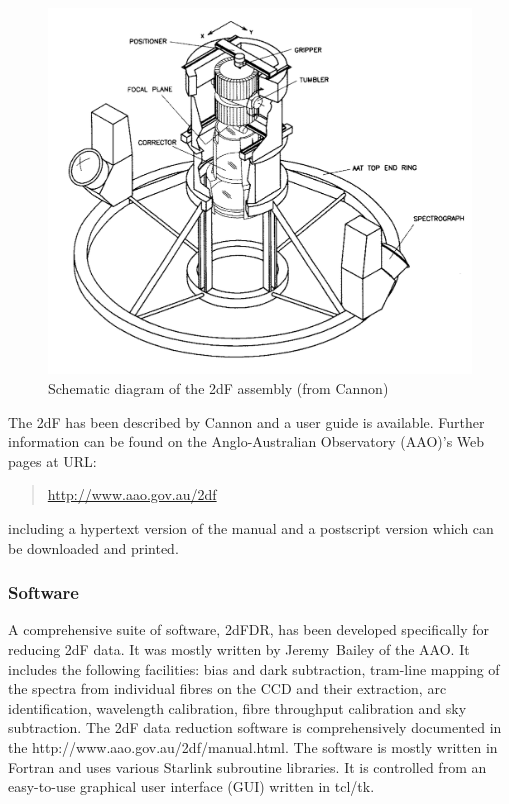 \documentclass[twoside,11pt]{starlink}
\begin{document}
\begin{figure}[htbp]
   \centering
   \includegraphics[totalheight=6in]{sc14_2df}
   \caption[Schematic diagram of the 2dF assembly]{Schematic diagram of
    the 2dF assembly (from Cannon\cite{CANNON97})
   \label{2DF_SCHEMATIC} }
\end{figure}

The 2dF has been described by Cannon\cite{CANNON97} and a user
guide is available\cite{BAILEY97}.  Further information can be found
on the Anglo-Australian Observatory (AAO)'s Web pages at URL:

\begin{quote}
\url{http://www.aao.gov.au/2df}
\end{quote}

including a hypertext version of the manual and a postscript version
which can be downloaded and printed.

\subsubsection{\label{2DF_S}Software}

A comprehensive suite of software, 2dFDR, has been developed specifically
for reducing 2dF data.  It was mostly written by Jeremy~Bailey of the
AAO.  It includes the following facilities: bias and dark subtraction,
tram-line mapping of the spectra from individual fibres on the CCD and
their extraction, arc identification, wavelength calibration, fibre
throughput calibration and sky subtraction.  The 2dF data reduction
software is comprehensively documented in the
{http://www.aao.gov.au/2df/manual.html}\cite{BAILEY97}.
The software is mostly written in Fortran and uses various Starlink
subroutine libraries.  It is controlled from an easy-to-use graphical
user interface (GUI) written in tcl/tk.
\end{document}

